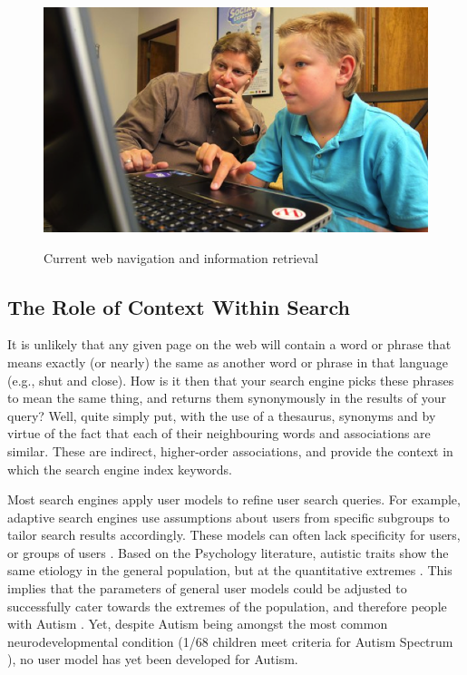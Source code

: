 \documentclass[a4paper, 11pt]{article}
\begin{document}
\begin{justify}
\begin{figure}[H]
\begin{center}
\includegraphics[scale=0.4]{person}\\
\caption{Current web navigation and information retrieval \cite{person}}
\end{center}
\end{figure}

\subsection{The Role of Context Within Search} \label{the problem}
It is unlikely that any given page on the web will contain a word or phrase that means exactly (or nearly) the same as another word or phrase in that language (e.g., shut and close). How is it then that your search engine picks these phrases to mean the same thing, and returns them synonymously in the results of your query? Well, quite simply put, with the use of a thesaurus, synonyms and by virtue of the fact that each of their neighbouring words and associations are similar. These are indirect, higher-order associations, and provide the context in which the search engine index keywords.

Most search engines apply user models to refine user search queries. For example, adaptive search engines use assumptions about users from specific subgroups to tailor search results accordingly. These models can often lack specificity for users, or groups of users \cite{usermodel}.  Based on the Psychology literature, autistic traits show the same etiology in the general population, but at the quantitative extremes \cite{robinson}. This implies that the parameters of general user models could be adjusted to successfully cater towards the extremes of the population, and therefore people with Autism \cite{bonel}. Yet, despite Autism being amongst the most common neurodevelopmental condition (1/68 children meet criteria for Autism Spectrum \cite{CDC}), no user model has yet been developed for Autism. 


\end{justify}
\end{document}
